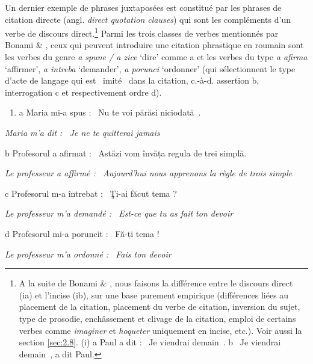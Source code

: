 Un dernier exemple de phrases juxtaposées est constitué par les phrases de citation directe (angl. \textit{direct quotation clauses}) qui sont les compléments d'un verbe de discours direct.\footnote{A la suite de Bonami \& \citet{Godard2008b}, nous faisons la différence entre le discours direct (ia) et l'incise (ib), sur une base purement empirique (différences liées au placement de la citation, placement du verbe de citation, inversion du sujet, type de prosodie, enchâssement et clivage de la citation, emploi de certains verbes comme \textit{imaginer} et\textit{ hoqueter} uniquement en incise, etc.). Voir aussi la section \ref{sec:2.8}.
 (i)  a  Paul a dit : {\guillemotleft}~Je viendrai demain~{\guillemotright}. 
  b  {\guillemotleft}~Je viendrai demain~{\guillemotright}, a dit Paul.} Parmi les trois classes de verbes mentionnés par Bonami \& \citet{Godard2008b}, ceux qui peuvent introduire une citation phrastique en roumain sont les verbes du genre \textit{a spune / a zice} `dire' comme a et les verbes du type \textit{a afirma} `affirmer', \textit{a întreba} `demander', \textit{a porunci} `ordonner' (qui sélectionnent le type d'acte de langage qui est {\guillemotleft}~imité~{\guillemotright} dans la citation, c.-à-d. assertion b, interrogation c et respectivement ordre d).  


\begin{enumerate}
\item \label{bkm:Ref275335879}a  Maria mi-a spus : {\guillemotleft}~Nu te voi părăsi niciodată~{\guillemotright}.


\end{enumerate}
{\itshape
Maria m'a dit : {\guillemotleft}~Je ne te quitterai jamais~{\guillemotright}}

  b  Profesorul a afirmat : {\guillemotleft}~Astăzi vom învăța regula de trei simplă.~{\guillemotright}

{\itshape
Le professeur a affirmé : {\guillemotleft}~Aujourd'hui nous apprenons la règle de trois simple~{\guillemotright}}

 c  Profesorul m-a întrebat : {\guillemotleft}~\c{T}i-ai făcut tema ?~{\guillemotright}

{\itshape
    Le professeur m'a demandé : {\guillemotleft}~Est-ce que tu as fait ton devoir~{\guillemotright}}

  d  Profesorul mi-a poruncit : {\guillemotleft}~Fă-ți tema !~{\guillemotright}

\textit{Le professeur m'a ordonné : {\guillemotleft}~Fais ton devoir~{\guillemotright}}  


